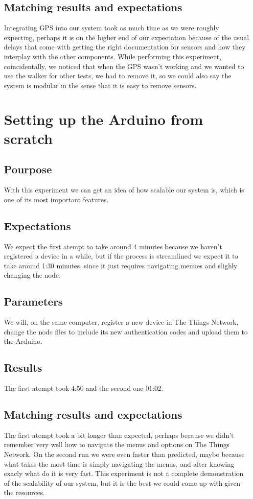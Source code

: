 	\subsection{Matching results and expectations}
	Integrating GPS into our system took as much time as we were roughly expecting, perhaps it is on the higher end of our expectation because of the usual delays that come with getting the right documentation for sensors and how they interplay with the other components. While performing this experiment, coincidentally, we noticed that when the GPS wasn't working and we wanted to use the walker for other tests, we had to remove it, so we could also say the system is modular in the sense that it is easy to remove sensors.



\section{Setting up the Arduino from scratch}

	\subsection{Pourpose}
		With this experiment we can get an idea of how scalable our system is, which is one of its most important features.
	\subsection{Expectations}
		We expect the first atempt to take around 4 minutes because we haven't registered a device in a while, but if the process is streamlined we expect it to take around 1:30 minutes, since it just requires navigating menues and slighly changing the node.
	\subsection{Parameters}
		We will, on the same computer, register a new device in The Things Network, change the node files to include its new authentication codes and upload them to the Arduino.
	\subsection{Results}
		The first atempt took 4:50 and the second one 01:02.
	\subsection{Matching results and expectations}
		The first atempt took a bit longer than expected, perhaps because we didn't remember very well how to navigate the menus and options on The Things Network. On the second run we were even faster than predicted, maybe because what takes the most time is simply navigating the menus, and after knowing exacly what do it is very fast. This experiment is not a complete demonstration of the scalability of our system, but it is the best we could come up with given the resources.

